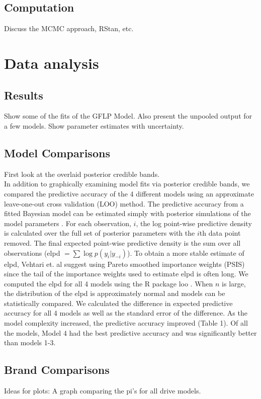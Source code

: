 \documentclass[12pt]{article}
\begin{document}
\subsection{Computation}
Discuss the MCMC approach, RStan, etc.

\section{Data analysis}
\subsection{Results}
Show some of the fits of the GFLP Model.  Also present the unpooled output for a few models.  Show parameter estimates with uncertainty. 

\subsection{Model Comparisons}
First look at the overlaid posterior credible bands. \\

In addition to graphically examining model fits via posterior credible bands, we compared the predictive accuracy of the 4 different models using an approximate leave-one-out cross validation (LOO) method.  The predictive accuracy from a fitted Bayesian model can be estimated simply with posterior simulations of the model parameters \cite{vehtari}.  For each observation, $i$, the log point-wise predictive density is calculated over the full set of posterior parameters with the $i$th data point removed.  The final expected point-wise predictive density is the sum over all observations (elpd $=\sum{\log p(y_i|y_{-i})}$).  To obtain a more stable estimate of elpd, Vehtari et. al suggest using Pareto smoothed importance weights (PSIS) since the tail of the importance weights used to estimate elpd is often long.  We computed the elpd for all 4 models using the R package loo \cite{loopackage}.  When $n$ is large, the distribution of the elpd is approximately normal and models can be statistically compared.  We calculated the difference in expected predictive accuracy for all 4 models as well as the standard error of the difference.  As the model complexity increased, the predictive accuracy improved (Table 1).  Of all the models, Model 4 had the best predictive accuracy and was significantly better than models 1-3.

\subsection{Brand Comparisons}
Ideas for plots: A graph comparing the pi's for all drive models.
\end{document}
